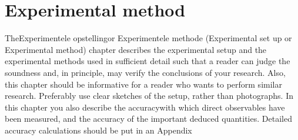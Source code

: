 \section{Experimental method}
TheExperimentele  opstellingor Experimentele  methode (Experimental  set  up  or  Experimental method) chapter describes the experimental setup and the experimental methods used in sufficient detail such that a reader can judge the soundness and, in principle, may verify the conclusions of your research. Also,  this  chapter  should  be  informative  for  a  reader  who  wants  to  perform  similar  research.  Preferably  use clear sketches of the setup, rather than photographs. In this chapter you also describe the accuracywith which direct observables have been measured, and the accuracy of the important deduced quantities. Detailed accuracy calculations should be put in an Appendix